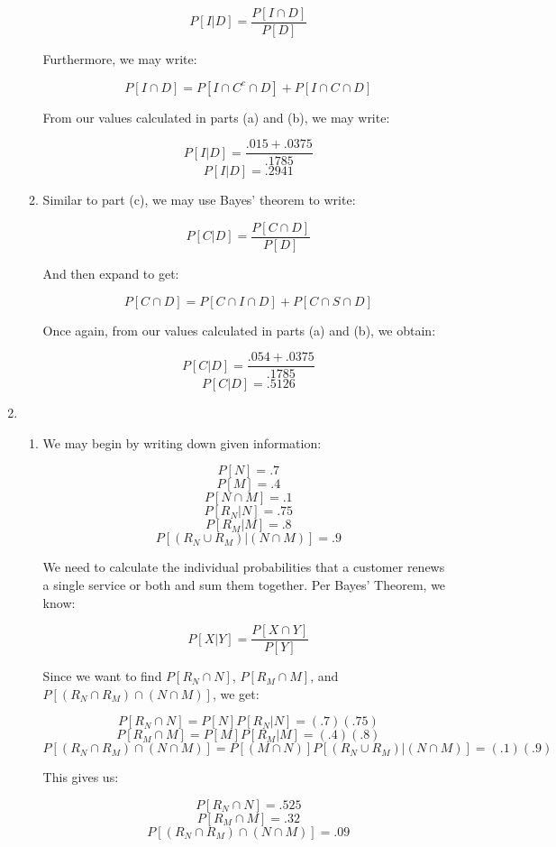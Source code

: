 \begin{enumerate}
\begin{enumerate}
        $$P[I|D]=\frac{P[I\cap D]}{P[D]}$$

        Furthermore, we may write:

        $$P[I\cap D]=P[I\cap C^c\cap D]+P[I\cap C\cap D]$$

        From our values calculated in parts (a) and (b), we may write:

        $$P[I|D]=\frac{.015+.0375}{.1785}$$
        $$\boxed{P[I|D]=.2941}$$

      \item Similar to part (c), we may use Bayes' theorem to write:

        $$P[C|D]=\frac{P[C\cap D]}{P[D]}$$

        And then expand to get:

        $$P[C\cap D]=P[C\cap I\cap D]+P[C\cap S\cap D]$$

        Once again, from our values calculated in parts (a) and (b), we obtain:

        $$P[C|D]=\frac{.054+.0375}{.1785}$$
        $$\boxed{P[C|D]=.5126}$$

    \end{enumerate}

  \item

    \begin{enumerate}

      \item We may begin by writing down given information:

        $$P[N]=.7$$
        $$P[M]=.4$$
        $$P[N\cap M]=.1$$
        $$P[R_N|N]=.75$$
        $$P[R_M|M]=.8$$
        $$P[(R_N\cup R_M) |(N\cap M)]=.9$$

        We need to calculate the individual probabilities that a customer renews a single service or both and sum them together. Per Bayes' Theorem, we know:

        $$P[X|Y]=\frac{P[X\cap Y]}{P[Y]}$$

        Since we want to find $P[R_N\cap N]$, $P[R_M\cap M]$, and $P[(R_N\cap R_M)\cap(N\cap M)]$, we get:

        $$P[R_N\cap N]=P[N]P[R_N|N]=(.7)(.75)$$
        $$P[R_M\cap M]=P[M]P[R_M|M]=(.4)(.8)$$
        $$P[(R_N\cap R_M)\cap(N\cap M)]=P[(M\cap N)]P[(R_N\cup R_M) |(N\cap M)]=(.1)(.9)$$

        This gives us:

        $$\boxed{P[R_N\cap N]=.525}$$
        $$\boxed{P[R_M\cap M]=.32}$$
        $$\boxed{P[(R_N\cap R_M)\cap(N\cap M)]=.09}$$


\end{enumerate}
\end{enumerate}
